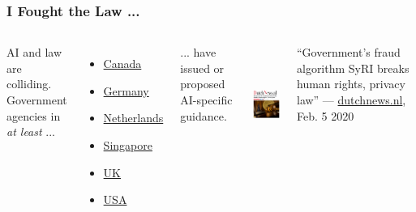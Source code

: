 \documentclass[11pt,
               aspectratio=169,
               hyperref={colorlinks}
               ]{beamer}
\begin{document}
	\begin{frame}[t]
		
		\frametitle{I Fought the Law ...}
			
		\begin{columns}			
			
					\noindent AI and law are colliding.\\
					\vspace{5pt}
			\noindent Government agencies in \textit{at least} ...
			\begin{itemize}\small
				\item \href{https://bit.ly/2tRJwmy}{Canada}
				\item \href{https://bit.ly/2UKSAVh}{Germany}
				\item \href{https://bit.ly/39xWLIu}{Netherlands}
				\item \href{https://www.pdpc.gov.sg/Resources/Model-AI-Gov}{Singapore}
				\item \href{https://bit.ly/38ovaJh}{UK}
				\item \href{https://bit.ly/2wcJOW1}{USA}
			\end{itemize}\normalsize
			\vspace{5pt}
			... have issued or proposed AI-specific guidance.			
		
			\begin{center}
			\includegraphics[height=110pt]{img/syri.png}
			\end{center}
			\small
			“Government’s fraud algorithm SyRI breaks human rights, privacy law” --- \href{https://www.dutchnews.nl/news/2020/02/governments-fraud-algorithm-syri-breaks-human-rights-privacy-law/}{dutchnews.nl}, Feb. 5 2020
			
		\end{columns}\normalsize
		
	\end{frame}
	

\end{document}
